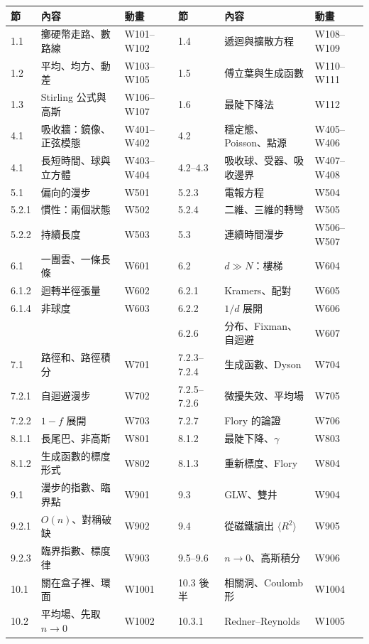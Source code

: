 \documentclass[11pt,a4paper]{article}
\begin{document}
\begin{center}
\small
\begin{tabular}{@{}lll@{\qquad}lll@{}}
\toprule
節 & 內容 & 動畫 & 節 & 內容 & 動畫\\
\midrule
1.1 & 擲硬幣走路、數路線 & W101--W102 & 1.4 & 遞迴與擴散方程 & W108--W109\\
1.2 & 平均、均方、動差 & W103--W105 & 1.5 & 傅立葉與生成函數 & W110--W111\\
1.3 & Stirling 公式與高斯 & W106--W107 & 1.6 & 最陡下降法 & W112\\
\midrule
4.1 & 吸收牆：鏡像、正弦模態 & W401--W402 & 4.2 & 穩定態、Poisson、點源 & W405--W406\\
4.1 & 長短時間、球與立方體 & W403--W404 & 4.2--4.3 & 吸收球、受器、吸收邊界 & W407--W408\\
\midrule
5.1 & 偏向的漫步 & W501 & 5.2.3 & 電報方程 & W504\\
5.2.1 & 慣性：兩個狀態 & W502 & 5.2.4 & 二維、三維的轉彎 & W505\\
5.2.2 & 持續長度 & W503 & 5.3 & 連續時間漫步 & W506--W507\\
\midrule
6.1 & 一團雲、一條長條 & W601 & 6.2 & $d\gg N$：樓梯 & W604\\
6.1.2 & 迴轉半徑張量 & W602 & 6.2.1 & Kramers、配對 & W605\\
6.1.4 & 非球度 & W603 & 6.2.2 & $1/d$ 展開 & W606\\
 & & & 6.2.6 & 分布、Fixman、自迴避 & W607\\
\midrule
7.1 & 路徑和、路徑積分 & W701 & 7.2.3--7.2.4 & 生成函數、Dyson & W704\\
7.2.1 & 自迴避漫步 & W702 & 7.2.5--7.2.6 & 微擾失效、平均場 & W705\\
7.2.2 & $1-f$ 展開 & W703 & 7.2.7 & Flory 的論證 & W706\\
\midrule
8.1.1 & 長尾巴、非高斯 & W801 & 8.1.2 & 最陡下降、$\gamma$ & W803\\
8.1.2 & 生成函數的標度形式 & W802 & 8.1.3 & 重新標度、Flory & W804\\
\midrule
9.1 & 漫步的指數、臨界點 & W901 & 9.3 & GLW、雙井 & W904\\
9.2.1 & $O(n)$、對稱破缺 & W902 & 9.4 & 從磁鐵讀出 $\langle R^2\rangle$ & W905\\
9.2.3 & 臨界指數、標度律 & W903 & 9.5--9.6 & $n\to0$、高斯積分 & W906\\
\midrule
10.1 & 關在盒子裡、環面 & W1001 & 10.3 後半 & 相關洞、Coulomb 形 & W1004\\
10.2 & 平均場、先取 $n\to0$ & W1002 & 10.3.1 & Redner--Reynolds & W1005\\

\end{tabular}
\end{center}
\end{document}
